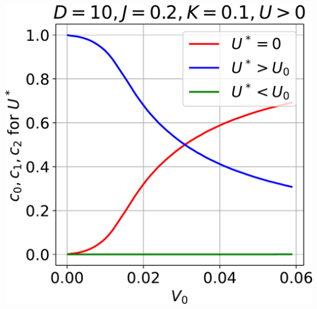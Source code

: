 \documentclass[12pt,twoside]{article}
\numberwithin{equation}{section}
\begin{document}
\begin{center}
\begin{minipage}{.49\textwidth}
    \includegraphics[scale=0.38]{../figures/quad1.pdf}
\end{minipage}

  \medskip


\end{center}
\end{document}
